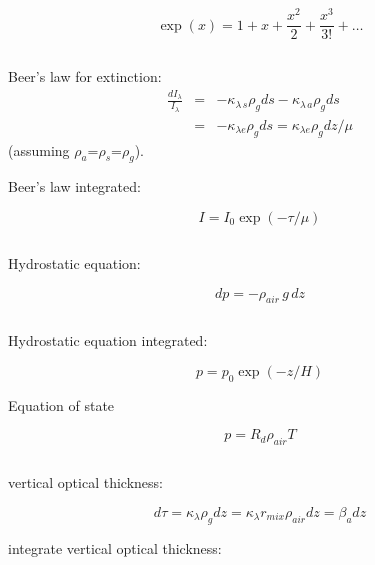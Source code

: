 \documentclass[12pt]{article}
\begin{document}
\begin{multicols}{2}
\begin{equation}
  \label{eq:exp}
  \exp(x) = 1 + x +  \frac{x^2}{2} + \frac{x^3}{3!} + \ldots
\end{equation}

\vspace{0.5in}



$~$



\noindent
Beer's law for extinction:
\begin{eqnarray}
  \label{eq:extinct}
\frac{dI_\lambda}{I_\lambda}  & = & - \kappa_{\lambda\, s} \rho_{g} ds - 
                    \kappa_{\lambda\,a } \rho_{g} ds \nonumber\\
        &=& - \kappa_{\lambda e} \rho_{g} ds = \kappa_{\lambda e} \rho_{g} dz/\mu
\end{eqnarray}
(assuming $\rho_{a}$=$\rho_{s}$=$\rho_{g}$).

\noindent
Beer's law integrated:

\begin{equation}
  \label{eq:binteg}
  I= I_0 \exp (- \tau/\mu)
\end{equation}


$~$

\noindent
Hydrostatic equation:

\begin{equation}
  \label{eq:hydro}
  dp = -\rho_{air}\, g\, dz
\end{equation}

$~$

Hydrostatic equation integrated:

\begin{equation}
  \label{eq:hydroint}
p = p_0 \exp(-z/H)
\end{equation}


\noindent
Equation of state

\begin{equation}
  \label{eq:state}
  p = R_d \rho_{air} T
\end{equation}


$~$

\noindent
vertical optical thickness:

\begin{equation}
  \label{eq:tauThick}
  d \tau =  \kappa_\lambda \rho_g dz = \kappa_\lambda r_{mix} \rho_{air} dz = \beta_a dz
\end{equation}

\noindent
integrate vertical optical thickness:


\end{multicols}
\end{document}
